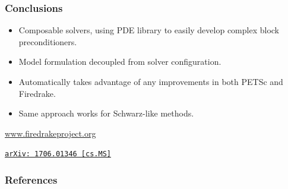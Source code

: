 \documentclass[presentation,aspectratio=43]{beamer}
\newcommand{\arxivlink}[2]{%
  \href{http://www.arxiv.org/abs/#1}%
  {{\small\texttt{arXiv:\,#1\,[#2]}}}%
}
\begin{document}
\begin{frame}
  \frametitle{Conclusions}

  \begin{itemize}
  \item Composable solvers, using PDE library to easily
    develop complex block preconditioners.

  \item Model formulation decoupled from solver configuration.

  \item Automatically takes advantage of any improvements in both
    PETSc and Firedrake.

  \item Same approach works for Schwarz-like methods.
  \end{itemize}
  \begin{center}
    \url{www.firedrakeproject.org}
  \end{center}

  \begin{flushright}
    {\footnotesize
    \textcite{Kirby:2018} \arxivlink{1706.01346}{cs.MS}}
  \end{flushright}
\end{frame}


\appendix
\begin{frame}
  \frametitle{References}
  \printbibliography[heading=none]
\end{frame}
\end{document}
